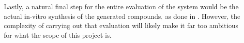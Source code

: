 \documentclass{article}
\begin{document}
 Lastly, a natural final step for the entire evaluation of the system would be the actual
 in-vitro synthesis of the generated compounds, as done in \cite{Zhavoronkov2019}.
 However, the complexity of carrying out that evaluation will likely make it far too
 ambitious for what the scope of this project is.
 









    
\end{document}
